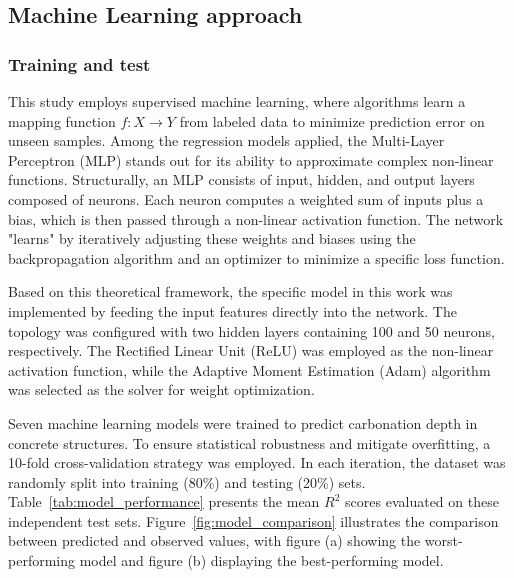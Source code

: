 \subsection{Machine Learning approach}

\subsubsection{Training and test}
This study employs supervised machine learning, where algorithms learn a mapping function $f: X \to Y$ from labeled data to minimize prediction error on unseen samples. Among the regression models applied, the Multi-Layer Perceptron (MLP) stands out for its ability to approximate complex non-linear functions. Structurally, an MLP consists of input, hidden, and output layers composed of neurons. Each neuron computes a weighted sum of inputs plus a bias, which is then passed through a non-linear activation function. The network "learns" by iteratively adjusting these weights and biases using the backpropagation algorithm and an optimizer to minimize a specific loss function.

Based on this theoretical framework, the specific model in this work was implemented by feeding the input features directly into the network. The topology was configured with two hidden layers containing 100 and 50 neurons, respectively. The Rectified Linear Unit (ReLU) was employed as the non-linear activation function, while the Adaptive Moment Estimation (Adam) algorithm was selected as the solver for weight optimization.

Seven machine learning models were trained to predict carbonation depth in concrete structures. To ensure statistical robustness and mitigate overfitting, a 10-fold cross-validation strategy was employed. In each iteration, the dataset was randomly split into training (80\%) and testing (20\%) sets. Table~\ref{tab:model_performance} presents the mean $R^2$ scores evaluated on these independent test sets. Figure~\ref{fig:model_comparison} illustrates the comparison between predicted and observed values, with figure (a) showing the worst-performing model and figure (b) displaying the best-performing model.

